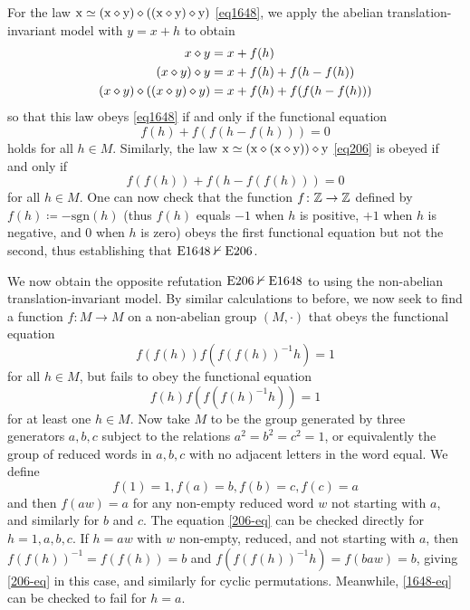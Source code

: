 \begin{example}\label{abex}  For the law $\mathrm{x} \simeq (\mathrm{x} \diamond \mathrm{y}) \diamond ((\mathrm{x} \diamond \mathrm{y}) \diamond \mathrm{y})$ \eqref{eq1648}, we apply the abelian translation-invariant model  with $y=x+h$ to obtain
\begin{align*}
  x \diamond y &= x + f(h) \\
  (x \diamond y) \diamond y &= x + f(h) + f(h-f(h)) \\
  (x \diamond y) \diamond ((x \diamond y) \diamond y) &= x + f(h) + f(f(h-f(h)))
\end{align*}
so that this law obeys \eqref{eq1648} if and only if the functional equation
$$f(h) + f(f(h-f(h))) = 0$$
holds for all $h \in M$.  Similarly, the law $\mathrm{x} \simeq (\mathrm{x} \diamond (\mathrm{x} \diamond \mathrm{y})) \diamond \mathrm{y}$ \eqref{eq206} is obeyed if and only if
$$ f(f(h)) + f(h - f(f(h))) = 0$$
for all $h \in M$.  One can now check that the function $f \colon \mathbb{Z} \to \mathbb{Z}$ defined by $f(h) \coloneqq - \mathrm{sgn}(h)$ (thus $f(h)$ equals $-1$ when $h$ is positive, $+1$ when $h$ is negative, and $0$ when $h$ is zero) obeys the first functional equation but not the second, thus establishing that $\mathrm{E}1648 \nvdash \mathrm{E}206$.
\end{example}

\begin{example}\label{trans-nonab}  We now obtain the opposite refutation $\mathrm{E}206 \nvdash \mathrm{E}1648$ to  using the non-abelian translation-invariant model.  By similar calculations to before, we now seek to find a function $f \colon M \to M$ on a non-abelian group $(M,\cdot)$ that obeys the functional equation
\begin{equation}\label{206-eq}
 f(f(h)) f(f(f(h))^{-1} h) = 1
\end{equation}
for all $h \in M$, but fails to obey the functional equation
\begin{equation}\label{1648-eq}
   f(h) f(f(f(h)^{-1} h)) = 1
\end{equation}
for at least one $h \in M$.  Now take $M$ to be the group generated by three generators $a,b,c$ subject to the relations $a^2=b^2=c^2=1$, or equivalently the group of reduced words in $a,b,c$ with no adjacent letters in the word equal.  We define
$$ f(1) = 1, f(a)=b, f(b) = c, f(c) = a$$
and then $f(aw)=a$ for any non-empty reduced word $w$ not starting with $a$, and similarly for $b$ and $c$.  The equation \eqref{206-eq} can be checked directly for $h=1,a,b,c$.  If $h=aw$ with $w$ non-empty, reduced, and not starting with $a$, then $f(f(h))^{-1} = f(f(h)) = b$ and $f(f(f(h))^{-1} h) = f(baw) = b$, giving \eqref{206-eq} in this case, and similarly for cyclic permutations. Meanwhile, \eqref{1648-eq} can be checked to fail for $h=a$.
\end{example}

